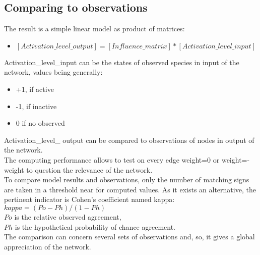 \documentclass[11pt]{article}
\begin{document}
\subsection{Comparing to observations}
The result is a simple linear model as product of matrices:
\begin{itemize}
\item $[Activation\_level\_ output] = [Influence\_matrix] * [Activation\_level\_input]$
\end{itemize}
Activation\_level\_input can be the states of observed species in input of the network, values being generally:
\begin{itemize}
\item +1, if active
\item -1, if inactive
\item 0 if no observed
\end{itemize}
Activation\_level\_ output can be compared to observations of nodes in output of the network.\\
The computing performance allows to test on every edge weight=0 or weight=-weight to question the relevance of the network.\\
To compare model results and observations, only the number of matching signs are taken in a threshold near for computed values. As it exists an alternative, the pertinent indicator is Cohen's coefficient named kappa:\\
\hspace*{1cm}$kappa=(Po-Ph)/(1-Ph)$ \\
\hspace*{1cm}$Po$ is the relative observed agreement,\\
\hspace*{1cm}$Ph$ is the hypothetical probability of chance agreement.\\
The comparison can concern several sets of observations and, so, it gives a global appreciation of the network.
\end{document}
